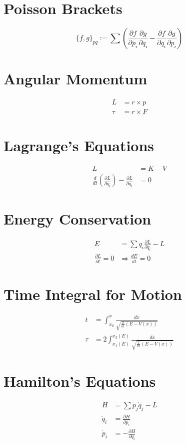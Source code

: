 \documentclass{article}
\begin{document}
\section{Poisson Brackets}
\begin{equation}
    \{f, g\}_{pq} := \sum \left( \frac{\partial f}{\partial p_i} \frac{\partial g}{\partial q_i} - \frac{\partial f}{\partial q_i} \frac{\partial g}{\partial p_i} \right)
\end{equation}

\section{Angular Momentum}
\begin{align}
    L &= r \times p \\
    \tau &= r \times F
\end{align}

\section{Lagrange’s Equations}
\begin{align}
    L &= K - V \\
    \frac{d}{dt} \left( \frac{\partial L}{\partial \dot{q}_i} \right) - \frac{\partial L}{\partial q_i} &= 0
\end{align}

\section{Energy Conservation}
\begin{align}
    E &= \sum q_i \frac{\partial L}{\partial \dot{q}_i} - L \\
    \frac{\partial L}{\partial t} = 0 &\Rightarrow \frac{dE}{dt} = 0
\end{align}

\section{Time Integral for Motion}
\begin{align}
    t &= \int_{x_0}^{x} \frac{dx}{\sqrt{\frac{2}{m} (E - V(x))}} \\
    \tau &= 2 \int_{x_1(E)}^{x_2(E)} \frac{dx}{\sqrt{\frac{2}{m} (E - V(x))}}
\end{align}

\section{Hamilton’s Equations}
\begin{align}
    H &= \sum p_j \dot{q}_j - L \\
    \dot{q}_i &= \frac{\partial H}{\partial p_i} \\
    \dot{p}_i &= -\frac{\partial H}{\partial q_i}
\end{align}
\end{document}
